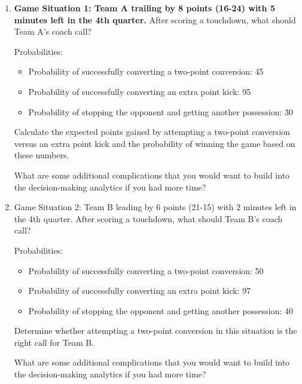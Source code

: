 \begin{enumerate}
	\item \textbf{Game Situation 1: Team A trailing by 8 points (16-24) with 5 minutes left in the 4th quarter.}
After scoring a touchdown, what should Team A's coach call?

Probabilities: 
\begin{itemize}
	\item Probability of successfully converting a two-point conversion: 45%
	\item Probability of successfully converting an extra point kick: 95%
	\item Probability of stopping the opponent and getting another possession: 30%
\end{itemize}
Calculate the expected points gained by attempting a two-point conversion versus an extra point kick and the probability of winning the game based on these numbers.  

What are some additional complications that you would want to build into the decision-making analytics if you had more time?
\vfill

\item Game Situation 2: Team B leading by 6 points (21-15) with 2 minutes left in the 4th quarter.
After scoring a touchdown, what should Team B's coach call?

Probabilities:
\begin{itemize}
	\item Probability of successfully converting a two-point conversion: 50%
	\item Probability of successfully converting an extra point kick: 97%
	\item Probability of stopping the opponent and getting another possession: 40%
\end{itemize}

Determine whether attempting a two-point conversion in this situation is the right call for Team B. 

What are some additional complications that you would want to build into the decision-making analytics if you had more time?\vfill

\end{enumerate}
